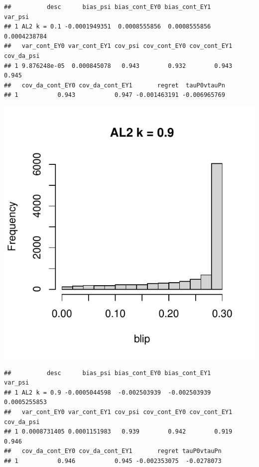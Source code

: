 \documentclass[11pt]{article}\usepackage[]{graphicx}\usepackage[table]{xcolor}
\makeatletter
\def\maxwidth{ %
  \ifdim\Gin@nat@width>\linewidth
    \linewidth
  \else
    \Gin@nat@width
  \fi
}
\newenvironment{kframe}{%
 \def\at@end@of@kframe{}%
 \ifinner\ifhmode%
  \def\at@end@of@kframe{\end{minipage}}%
  \begin{minipage}{\columnwidth}%
 \fi\fi%
 \def\FrameCommand##1{\hskip\@totalleftmargin \hskip-\fboxsep
 \colorbox{shadecolor}{##1}\hskip-\fboxsep
     \hskip-\linewidth \hskip-\@totalleftmargin \hskip\columnwidth}%
 \MakeFramed {\advance\hsize-\width
   \@totalleftmargin\z@ \linewidth\hsize
   \@setminipage}}%
 {\par\unskip\endMakeFramed%
 \at@end@of@kframe}
\newenvironment{knitrout}{}{} %
\makeatother
\begin{document}
\begin{knitrout}
\begin{kframe}\begin{verbatim}
##          desc      bias_psi bias_cont_EY0 bias_cont_EY1      var_psi
## 1 AL2 k = 0.1 -0.0001949351  0.0008555856  0.0008555856 0.0004238784
##   var_cont_EY0 var_cont_EY1 cov_psi cov_cont_EY0 cov_cont_EY1 cov_da_psi
## 1 9.876248e-05  0.000845078   0.943        0.932        0.943      0.945
##   cov_da_cont_EY0 cov_da_cont_EY1       regret  tauP0vtauPn
## 1           0.943           0.947 -0.001463191 -0.006965769
\end{verbatim}
\end{kframe}
\includegraphics[width=\maxwidth]{figure/unnamed-chunk-4-16} 
\begin{kframe}\begin{verbatim}
##          desc      bias_psi bias_cont_EY0 bias_cont_EY1      var_psi
## 1 AL2 k = 0.9 -0.0005044598  -0.002503939  -0.002503939 0.0005255853
##   var_cont_EY0 var_cont_EY1 cov_psi cov_cont_EY0 cov_cont_EY1 cov_da_psi
## 1 0.0008731405 0.0001151983   0.939        0.942        0.919      0.946
##   cov_da_cont_EY0 cov_da_cont_EY1       regret tauP0vtauPn
## 1           0.946           0.945 -0.002353075  -0.0278073
\end{verbatim}
\end{kframe}
\end{knitrout}
\end{document}
